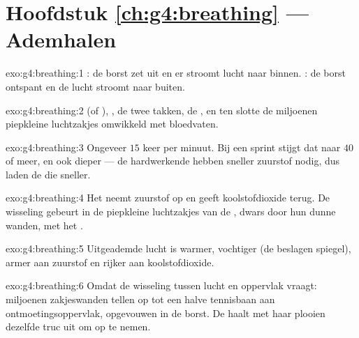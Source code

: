 \section*{Hoofdstuk \ref{ch:g4:breathing} --- Ademhalen}

\begin{solution}{exo:g4:breathing:1}
: de borst zet uit en er stroomt lucht naar binnen. :
de borst ontspant en de lucht stroomt naar buiten.
\end{solution}

\begin{solution}{exo:g4:breathing:2}
 (of ), , de twee takken, de , en ten slotte de
miljoenen piepkleine luchtzakjes omwikkeld met bloedvaten.
\end{solution}

\begin{solution}{exo:g4:breathing:3}
Ongeveer $15$ keer per minuut. Bij een sprint stijgt dat naar $40$ of
meer, en ook dieper --- de hardwerkende  hebben sneller zuurstof
nodig, dus laden de  die sneller.
\end{solution}

\begin{solution}{exo:g4:breathing:4}
Het neemt zuurstof op en geeft koolstofdioxide terug. De wisseling
gebeurt in de piepkleine luchtzakjes van de , dwars door hun dunne
wanden, met het .
\end{solution}

\begin{solution}{exo:g4:breathing:5}
Uitgeademde lucht is warmer, vochtiger (de beslagen spiegel), armer aan
zuurstof en rijker aan koolstofdioxide.
\end{solution}

\begin{solution}{exo:g4:breathing:6}
Omdat de wisseling tussen lucht en  oppervlak vraagt: miljoenen
zakjeswanden tellen op tot een halve tennisbaan aan ontmoetingsoppervlak,
opgevouwen in de borst. De  haalt met haar plooien dezelfde
truc uit om  op te nemen.
\end{solution}

